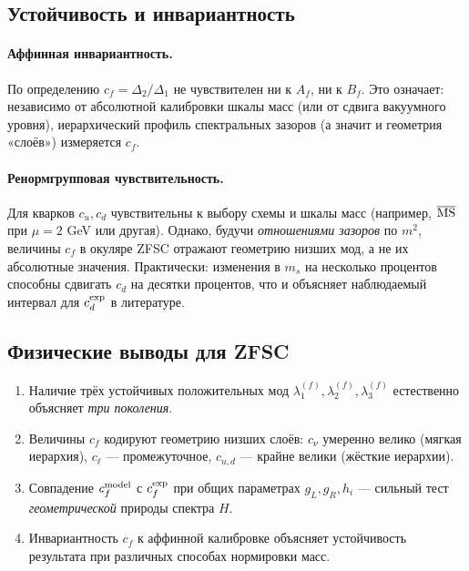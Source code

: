\subsection{Устойчивость и инвариантность}
\paragraph{Аффинная инвариантность.}
По определению \(c_f = \Delta_2/\Delta_1\) не чувствителен ни к \(A_f\), ни к \(B_f\). 
Это означает: независимо от абсолютной калибровки шкалы масс (или от сдвига вакуумного уровня),
иерархический профиль спектральных зазоров (а значит и геометрия «слоёв») измеряется \(c_f\).

\paragraph{Ренормгрупповая чувствительность.}
Для кварков \(c_u,c_d\) чувствительны к выбору схемы и шкалы масс
(например, \(\overline{\rm MS}\) при \(\mu=2\) GeV или другая).
Однако, будучи \emph{отношениями зазоров} по \(m^2\), величины \(c_f\) 
в окуляре ZFSC отражают геометрию низших мод, а не их абсолютные значения.
Практически: изменения в \(m_s\) на несколько процентов способны сдвигать \(c_d\) на десятки процентов,
что и объясняет наблюдаемый интервал для \(c_d^{\rm exp}\) в литературе.

\subsection{Физические выводы для ZFSC}
\begin{enumerate}
  \item Наличие трёх устойчивых положительных мод \(\lambda^{(f)}_1,\lambda^{(f)}_2,\lambda^{(f)}_3\) естественно объясняет \emph{три поколения}.
  \item Величины \(c_f\) кодируют геометрию низших слоёв: 
  \(c_\nu\) умеренно велико (мягкая иерархия), \(c_\ell\) — промежуточное, \(c_{u,d}\) — крайне велики (жёсткие иерархии).
  \item Совпадение \(c_f^{\rm model}\) с \(c_f^{\rm exp}\) при общих параметрах \(g_L,g_R,h_i\) — 
  сильный тест \emph{геометрической} природы спектра \(H\).
  \item Инвариантность \(c_f\) к аффинной калибровке объясняет устойчивость результата при различных способах нормировки масс.
\end{enumerate}

